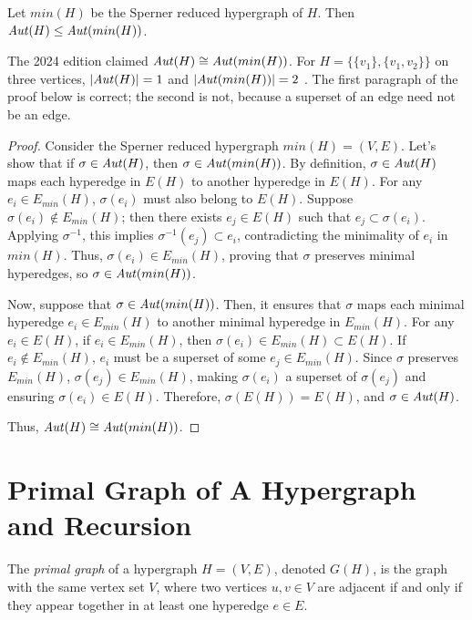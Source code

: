 \begin{corollary}\label{cor:aut-min}
Let $min(H)$ be the Sperner reduced hypergraph of $H$. Then $\mathit{Aut}(H)\le\mathit{Aut}(min(H))$.
\end{corollary}

The 2024 edition claimed $\mathit{Aut}(H)\cong\mathit{Aut}(min(H))$. For $H=\{\{v_1\},\{v_1,v_2\}\}$ on three vertices, $|\mathit{Aut}(H)|=1$ and $|\mathit{Aut}(min(H))|=2$ . The first paragraph of the proof below is correct; the second is not, because a superset of an edge need not be an edge.

\begin{proof}
Consider the Sperner reduced hypergraph $min(H)=(V,E)$. Let's show that if $\sigma\in\mathit{Aut}(H)$, then $\sigma\in\mathit{Aut}(min(H))$. By definition, $\sigma\in\mathit{Aut}(H)$ maps each hyperedge in $E(H)$ to another hyperedge in $E(H)$. For any $e_i\in E_{min}(H)$, $\sigma(e_i)$ must also belong to $E(H)$. Suppose $\sigma(e_i)\notin E_{min}(H)$; then there exists $e_j\in E(H)$ such that $e_j\subset\sigma(e_i)$. Applying $\sigma^{-1}$, this implies $\sigma^{-1}(e_j)\subset e_i$, contradicting the minimality of $e_i$ in $min(H)$. Thus, $\sigma(e_i)\in E_{min}(H)$, proving that $\sigma$ preserves minimal hyperedges, so $\sigma\in\mathit{Aut}(min(H))$.

Now, suppose that $\sigma\in\mathit{Aut}(min(H))$. Then, it ensures that $\sigma$ maps each minimal hyperedge $e_i\in E_{min}(H)$ to another minimal hyperedge in $E_{min}(H)$. For any $e_i\in E(H)$, if $e_i\in E_{min}(H)$, then $\sigma(e_i)\in E_{min}(H)\subset E(H)$. If $e_i\notin E_{min}(H)$, $e_i$ must be a superset of some $e_j\in E_{min}(H)$. Since $\sigma$ preserves $E_{min}(H)$, $\sigma(e_j)\in E_{min}(H)$, making $\sigma(e_i)$ a superset of $\sigma(e_j)$ and ensuring $\sigma(e_i)\in E(H)$. Therefore, $\sigma(E(H))=E(H)$, and $\sigma\in\mathit{Aut}(H)$.

Thus, $\mathit{Aut}(H)\cong\mathit{Aut}(min(H))$.
\end{proof}

\section{Primal Graph of A Hypergraph and \FKA{} Recursion}

\begin{definition}
The \emph{primal graph} of a hypergraph $H=(V,E)$, denoted $G(H)$, is the graph with the same vertex set $V$, where two vertices $u,v\in V$ are adjacent if and only if they appear together in at least one hyperedge $e\in E$.
\end{definition}

